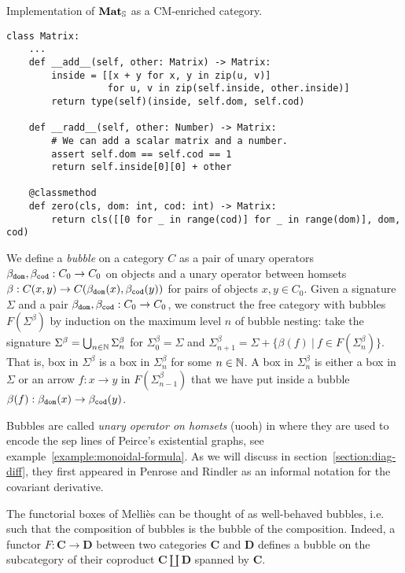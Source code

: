 \begin{python}
{\normalfont Implementation of $\mathbf{Mat}_\S$ as a CM-enriched category.}

\begin{verbatim}
class Matrix:
    ...
    def __add__(self, other: Matrix) -> Matrix:
        inside = [[x + y for x, y in zip(u, v)]
                  for u, v in zip(self.inside, other.inside)]
        return type(self)(inside, self.dom, self.cod)

    def __radd__(self, other: Number) -> Matrix:
        # We can add a scalar matrix and a number.
        assert self.dom == self.cod == 1
        return self.inside[0][0] + other

    @classmethod
    def zero(cls, dom: int, cod: int) -> Matrix:
        return cls([[0 for _ in range(cod)] for _ in range(dom)], dom, cod)
\end{verbatim}
\end{python}

We define a \emph{bubble} on a category $C$ as a pair of unary operators $\beta_\dom, \beta_\cod : C_0 \to C_0$ on objects and a unary operator between homsets $\beta : C(x, y) \to C(\beta_\dom(x), \beta_\cod(y))$ for pairs of objects $x, y \in C_0$.
Given a signature $\Sigma$ and a pair $\beta_\dom, \beta_\cod : C_0 \to C_0$, we construct the free category with bubbles $F(\Sigma^\beta)$ by induction on the maximum level $n$ of bubble nesting: take the signature $\Sigma^\beta = \bigcup_{n \in \N} \Sigma^\beta_n$
for $\Sigma^\beta_0 = \Sigma$ and $\Sigma^\beta_{n + 1} = \Sigma + \{ \beta(f) \ \vert \ f \in F(\Sigma^\beta_n) \}$.
That is, box in $\Sigma^\beta$ is a box in $\Sigma^\beta_{n}$ for some $n \in \N$.
A box in $\Sigma^\beta_{n}$ is either a box in $\Sigma$ or an arrow $f : x \to y$ in $F(\Sigma^\beta_{n - 1})$ that we have put inside a bubble $\beta(f) : \beta_\dom(x) \to \beta_\cod(y)$.

\begin{remark}
Bubbles are called \emph{unary operator on homsets} (uooh) in \cite{HaydonSobocinski20} where they are used to encode the sep lines of Peirce's existential graphs, see example~\ref{example:monoidal-formula}.
As we will discuss in section~\ref{section:diag-diff}, they first appeared in Penrose and Rindler \cite{PenroseRindler84} as an informal notation for the covariant derivative.
\end{remark}

\begin{example}
The functorial boxes of Melli\`es \cite{Mellies06} can be thought of as
well-behaved bubbles, i.e. such that the composition of bubbles is the
bubble of the composition. Indeed, a functor $F : \mathbf{C} \to \mathbf{D}$
between two categories $\mathbf{C}$ and $\mathbf{D}$ defines a bubble on the
subcategory of their coproduct $\mathbf{C} \coprod \mathbf{D}$ spanned by $\mathbf{C}$.
\end{example}


